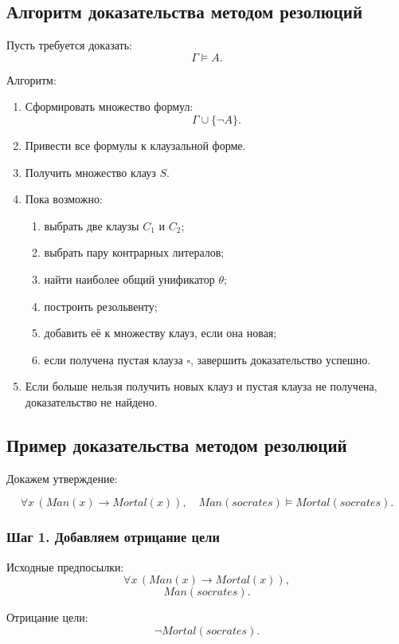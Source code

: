 \documentclass[12pt,a4paper]{article}
\begin{document}
\subsection{Алгоритм доказательства методом резолюций}

Пусть требуется доказать:
\[
\Gamma \models A.
\]

Алгоритм:
\begin{enumerate}
    \item Сформировать множество формул:
    \[
    \Gamma \cup \{\neg A\}.
    \]
    \item Привести все формулы к клаузальной форме.
    \item Получить множество клауз $S$.
    \item Пока возможно:
    \begin{enumerate}
        \item выбрать две клаузы $C_1$ и $C_2$;
        \item выбрать пару контрарных литералов;
        \item найти наиболее общий унификатор $\theta$;
        \item построить резольвенту;
        \item добавить её к множеству клауз, если она новая;
        \item если получена пустая клауза $\square$, завершить доказательство успешно.
    \end{enumerate}
    \item Если больше нельзя получить новых клауз и пустая клауза не получена, доказательство не найдено.
\end{enumerate}

\subsection{Пример доказательства методом резолюций}

Докажем утверждение:

\[
\forall x\,(Man(x) \to Mortal(x)), \quad Man(socrates)
\models Mortal(socrates).
\]

\subsubsection{Шаг 1. Добавляем отрицание цели}

Исходные предпосылки:
\[
\forall x\,(Man(x) \to Mortal(x)),
\]
\[
Man(socrates).
\]

Отрицание цели:
\[
\neg Mortal(socrates).
\]
\end{document}
